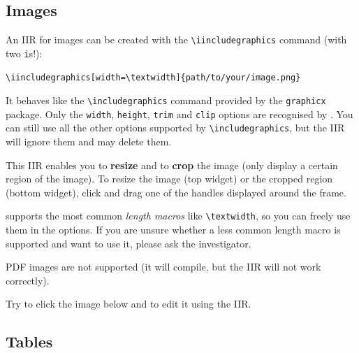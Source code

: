 \documentclass[11pt, a4paper]{article}
\begin{document}


\newpage
\subsection{Images}

An IIR for images can be created with the \verb|\iincludegraphics| command (with two \texttt{i}s!):

\begin{lstlisting}[style=custom-latex]
\iincludegraphics[width=\textwidth]{path/to/your/image.png}
\end{lstlisting}

It behaves like the \verb|\includegraphics| command provided by the \texttt{graphicx} package.
Only the \texttt{width}, \texttt{height}, \texttt{trim} and \texttt{clip} options are recognised by \iLaTeX{}.
You can still use all the other options supported by \verb|\includegraphics|, but the IIR will ignore them and may delete them.

This IIR enables you to \textbf{resize} and to \textbf{crop} the image (\ie only display a certain region of the image). To resize the image (top widget) or the cropped region (bottom widget), click and drag one of the handles displayed around the frame.

\begin{info}
    \iLaTeX{} supports the most common \emph{length macros} like \verb|\textwidth|, so you can freely use them in the options.
    If you are unsure whether a less common length macro is supported and want to use it, please ask the investigator.
\end{info}

\begin{warning}
    PDF images are not supported (it will compile, but the IIR will not work correctly).
\end{warning}

\begin{example}
    Try to click the image below and to edit it using the IIR.
    
    \centering
\end{example}




\newpage
\subsection{Tables}
\end{document}
